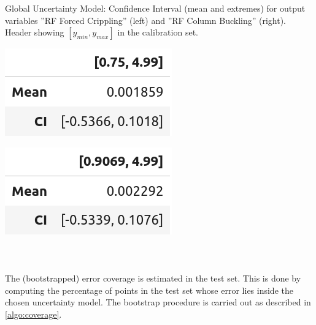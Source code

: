 \begin{table}[!htb]
	\caption{Global Uncertainty Model: Confidence Interval (mean and extremes) for output variables ''RF Forced Crippling'' (left) and ''RF Column Buckling'' (right). Header showing $[y_{min},y_{max}]$ in the calibration set.}
	\centering
	\begin{minipage}[t]{0.4\linewidth}
		\raggedright
		\includegraphics[scale=\tabscale]{Figures/uncertainty/gumtab1.png}
		\label{fig:gumtab1}
	\end{minipage}%
	\begin{minipage}[t]{0.4\linewidth}
		\raggedleft
		\includegraphics[scale=\tabscale]{Figures/uncertainty/gumtab2.png}
		\label{fig:gumtab2}
	\end{minipage}
	\label{tab:gum1}
\end{table}

\paragraph{ \\}
The (bootstrapped) error coverage is estimated in the test set. This is done by computing the percentage of points in the test set whose error lies inside the chosen uncertainty model. The bootstrap procedure is carried out as described in \autoref{algo:coverage}.

